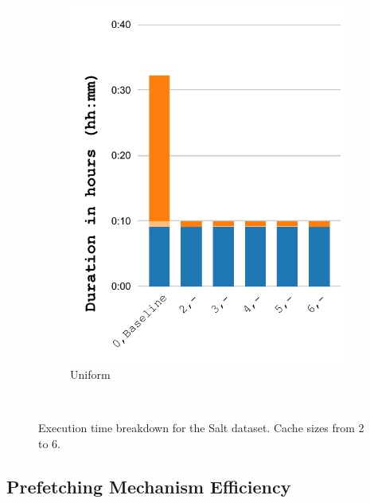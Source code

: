 \documentclass[Ingles,Final]{ic-tese-v3}
\begin{document}
\begin{figure}[]
\begin{subfigure}{0.3\textwidth}
        \includegraphics[width=\textwidth,trim={0 0 0 0},clip]{figures/prefetch_breakdown/prefetch_breakdown_uniform_salt.pdf}
        \caption{Uniform}
        \label{fig:prefetch_breakdown_uniform}
    \end{subfigure}\\
    \caption[Execution time breakdown (\checkpointprefetching)]{Execution time breakdown for the Salt dataset. Cache sizes from 2 to 6.}
    \label{fig:prefetch_breakdown}
\end{figure}

\subsection{Prefetching Mechanism Efficiency}
\label{sec:prefeff}
\end{document}
